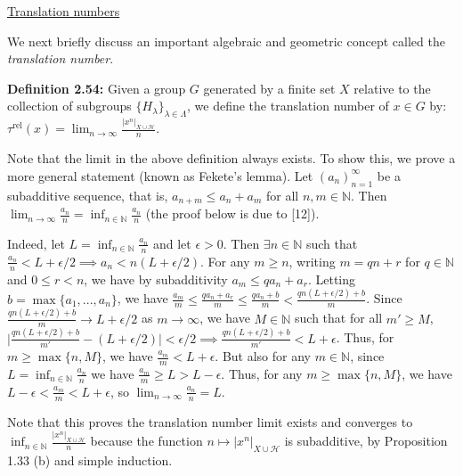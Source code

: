 \documentclass[12pt]{article}
\newcommand{\vs}{\vskip10pt}
\begin{document}
	\vs 
	
	\underline{Translation numbers}
	
	\vs 
	
	We next briefly discuss an important algebraic and geometric concept called the \textit{translation number}. 
	
	\vs 
	
	\textbf{Definition 2.54: } Given a group $G$ generated by a finite set $X$ relative to the collection of subgroups $\{H_{\lambda}\}_{\lambda \in \Lambda}$, we define the translation number of $x \in G$ by: $\tau^{\text{rel}}(x) = \lim_{n \rightarrow \infty} \frac{\vert x^n \vert_{X \cup \mathcal{H}}}{n}$. 
	
	\vs 
	
	Note that the limit in the above definition always exists. To show this, we prove a more general statement (known as Fekete's lemma). Let $(a_n)_{n=1}^{\infty}$ be a subadditive sequence, that is, $a_{n+m} \leq a_n + a_m$ for all $n,m \in \mathbb{N}$. Then $\lim_{n \rightarrow \infty} \frac{a_n}{n} = \inf_{n \in \mathbb{N}} \frac{a_n}{n}$ (the proof below is due to [12]). 
	
	\vs 
	
	Indeed, let $L = \inf_{n \in \mathbb{N}} \frac{a_n}{n}$ and let $\epsilon > 0$. Then $\exists n \in \mathbb{N}$ such that $\frac{a_n}{n} < L + \epsilon/2 \implies a_n < n(L + \epsilon/2)$. For any $m \geq n$, writing $m = qn + r$ for $q \in \mathbb{N}$ and $0 \leq r < n$, we have by subadditivity $a_m \leq q a_n + a_r$. Letting $b = \max \{a_1,...,a_n\}$, we have $\frac{a_m}{m} \leq \frac{qa_n + a_r}{m} \leq \frac{qa_n + b}{m}< \frac{q n(L + \epsilon/2) + b}{m}$. Since $\frac{q n(L + \epsilon/2) + b}{m} \rightarrow L + \epsilon/2$ as $m \rightarrow \infty$, we have $M \in \mathbb{N}$ such that for all $m' \geq M$, $\vert \frac{q n(L + \epsilon/2) + b}{m'} - (L+\epsilon/2) \vert < \epsilon/2 \implies \frac{q n(L + \epsilon/2) + b}{m'} < L + \epsilon$. Thus, for $m \geq \max \{n, M\}$, we have $\frac{a_m}{m} < L + \epsilon$. But also for any $m \in \mathbb{N}$, since $L = \inf_{n \in \mathbb{N}} \frac{a_n}{n}$ we have $\frac{a_m}{m} \geq L > L - \epsilon$. Thus, for any $m \geq \max \{n, M\}$, we have $L - \epsilon < \frac{a_m}{m} < L + \epsilon$, so $\lim_{n \rightarrow \infty} \frac{a_n}{n} = L$.
	
	\vs 
	
	Note that this proves the translation number limit exists and converges to $\inf_{n \in \mathbb{N}} \frac{\vert x^n \vert_{X \cup \mathcal{H}}}{n}$ because the function $n \mapsto \vert x^n \vert_{X \cup \mathcal{H}}$ is subadditive, by Proposition 1.33 (b) and simple induction.
	
\end{document}
